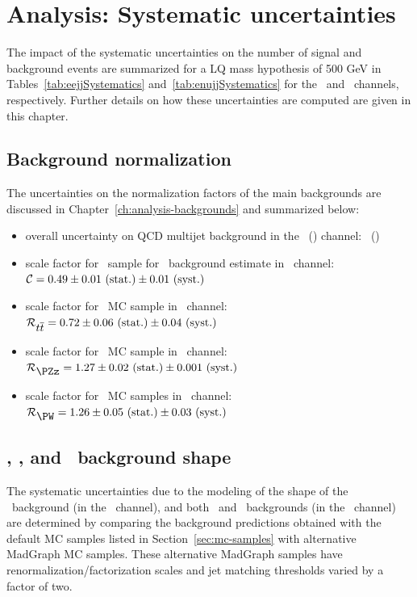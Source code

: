 \chapter{Analysis: Systematic uncertainties}
\label{ch:analysis-systematics}

The impact of the systematic uncertainties on the number of signal 
and background events are summarized for a LQ mass hypothesis of 500 GeV in Tables~\ref{tab:eejjSystematics} 
and~\ref{tab:enujjSystematics} for the \eejj~and \enujj~channels, respectively.
Further details on how these uncertainties are computed are given in this chapter.

\section{Background normalization} \label{sec:BkgNormUncert}
The uncertainties on the normalization factors of the main backgrounds 
are discussed in Chapter~\ref{ch:analysis-backgrounds} and summarized below:
\begin{itemize}
\item overall uncertainty on QCD multijet background in the \eejj~(\enujj) channel: \QCDUncertEEjj~(\QCDUncertEnujj)
\item scale factor for \emujj~sample for \ttbar~background estimate in \eejj~channel: \\ $\mathcal{C} = \mbox{$ 0.49 \pm 0.01 \mbox{ (stat.)} \pm 0.01 \mbox{ (syst.)}$}$
\item scale factor for \ttbar~MC sample in \enujj~channel: $\mathcal{R}_{\mbox{$t\overline{t}$}} = \mbox{$0.72 \pm 0.06 \mbox{ (stat.)} \pm 0.04 \mbox{ (syst.)}$}$
\item scale factor for \zjets~MC sample in \eejj~channel: $\mathcal{R}_{\mbox{\PZz}} = \mbox{\rescaleFactorZSherpa}$
\item scale factor for \wjets~MC samples in \enujj~channel: $\mathcal{R}_{\mbox{\PW}} = \mbox{\rescaleFactorWSherpa}$
\end{itemize}

\section{\ttbar, \zjets, and \wjets~background shape} \label{sec:BkgShapeUncert}

The systematic uncertainties due to the modeling 
of the shape of the \zjets~background (in the \eejj~channel), and  
both \ttbar~and \wjets~backgrounds (in the \enujj~channel) are determined 
by comparing the background predictions obtained with the default MC samples listed 
in Section~\ref{sec:mc-samples} with alternative {\sc MadGraph} MC samples.
These alternative {\sc MadGraph} samples have 
renormalization/factorization scales 
and jet matching thresholds varied by a factor of two. 

